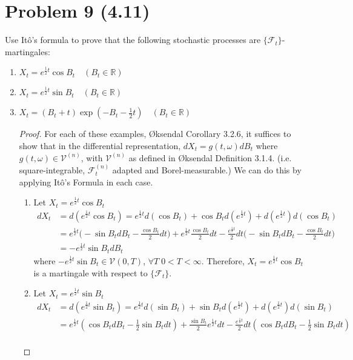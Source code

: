 \documentclass[11pt]{article}
\newcommand{\fcal}{\mathcal{F}}
\newcommand{\go}{\omega}
\newcommand{\seq}[1]{\{#1\}}
\begin{document}
 \section*{Problem 9 (4.11)}
Use It\^o's formula to prove that the following stochastic processes are $\seq{\fcal_t}$-martingales:
\begin{enumerate}
\item $X _ { t } = e ^ { \frac { 1 } { 2 } t } \cos B _ { t } \quad \left( B _ { t } \in \mathbb { R } \right)$
\item $X _ { t } = e ^ { \frac { 1 } { 2 } t } \sin B _ { t } \quad \left( B _ { t } \in \mathbb { R } \right)$
\item $X _ { t } = \left( B _ { t } + t \right) \exp \left( - B _ { t } - \frac { 1 } { 2 } t \right) \quad \left( B _ { t } \in \mathbb{ R } \right)$\\
\begin{proof}
For each of these examples, \O ksendal Corollary 3.2.6, it suffices to show that in the differential representation, $d X_t = g(t,\go) d B_t$ where $g(t,\go)\in \mathcal{V}^{(n)}$, with $\mathcal{V}^{(n)}$ as defined in \O ksendal Definition 3.1.4. (i.e. square-integrable, $\fcal_t^{(n)}$ adapted and Borel-measurable.)  We can do this by applying It\^o's Formula in each case.
\begin{enumerate}
\item Let $X_t=e^{\frac{1}{2} t} \cos B_t$
\begin{align*}
dX_t &= d(e^{\frac{1}{2} t} \cos B_t) = e^{\frac{1}{2} t} d (\cos B_t )+ \cos B_td(e^{\frac{1}{2} t})+ d(e^{\frac{1}{2} t} )d(\cos B_t)\\
&= e^{\frac{1}{2} t}\Big(-\sin B_t d B_t - \frac{\cos B_t}{2} dt \Big)+e^{\frac{1}{2} t} \frac{\cos B_t}{2}dt-\frac{e^{\frac{1}{2} t}}{2} dt \Big(-\sin B_t d B_t - \frac{\cos B_t}{2} dt \Big)\\
&= - e^{\frac{1}{2} t}\sin B_t dB_t
\end{align*}
where $- e^{\frac{1}{2} t}\sin B_t \in \mathcal{V}(0,T)$, $\forall T \; 0<T < \infty$.  Therefore, $X_t=e^{\frac{1}{2} t} \cos B_t$ is a martingale with respect to $\seq{\fcal_t}$.
\item Let $X_t=e^{\frac{1}{2} t} \sin B_t$
\begin{align*}
dX_t &= d(e^{\frac{1}{2} t} \sin B_t) = e^{\frac{1}{2} t} d (\sin B_t )+ \sin B_td(e^{\frac{1}{2} t})+ d(e^{\frac{1}{2} t} )d(\sin B_t)\\
&= e^{\frac{1}{2} t} ( \cos B_t dB_t -\frac{1}{2} \sin B_t dt) + \frac{\sin B_t}{2} e^{\frac{1}{2} t}dt- \frac{e^{\frac{1}{2} t}}{2} dt  ( \cos B_t dB_t -\frac{1}{2} \sin B_t dt)\\

\end{align*}
\end{enumerate}
\end{proof}
\end{enumerate}
\end{document}
